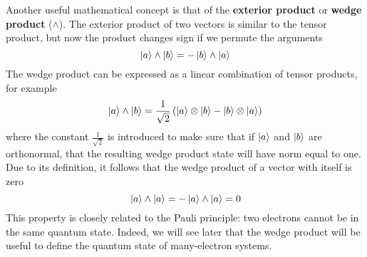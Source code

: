 \documentclass[../Main/chem532-notes.tex]{subfiles}
\begin{document}
Another useful mathematical concept is that of the \textbf{exterior product} or \textbf{wedge product} ($\wedge$).
The exterior product of two vectors is similar to the tensor product, but now the product changes sign if we permute the arguments
\begin{equation}
\ket{a} \wedge  \ket{b} = - \ket{b} \wedge  \ket{a} 
\end{equation}
The wedge product can be expressed as a linear combination of tensor products, for example
\begin{equation}
\ket{a} \wedge  \ket{b} =  \frac{1}{\sqrt{2}} \left( \ket{a} \otimes  \ket{b}  - \ket{b} \otimes  \ket{a}  \right)
\end{equation}
where the constant $\frac{1}{\sqrt{2}}$ is introduced to make sure that if $\ket{a}$ and $\ket{b}$ are orthonormal, that the resulting wedge product state will have norm equal to one.
Due to its definition, it follows that the wedge product of a vector with itself is zero
\begin{equation}
\ket{a} \wedge  \ket{a} = - \ket{a} \wedge  \ket{a} = 0
\end{equation}
This property is closely related to the Pauli principle: two electrons cannot be in the same quantum state. Indeed, we will see later that the wedge product will be useful to define the quantum state of many-electron systems.

%
\end{document}
